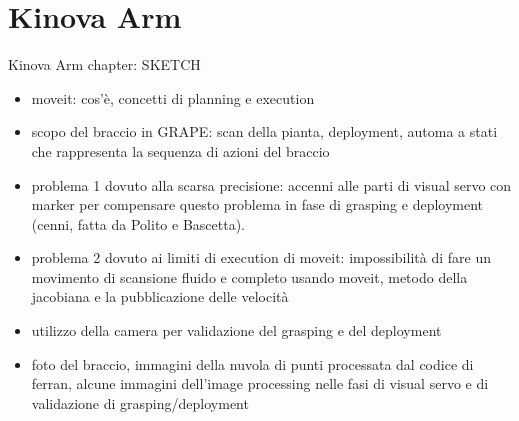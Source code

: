 
\chapter{Kinova Arm} \label{chap:kinovaArmChapter}

Kinova Arm chapter: SKETCH
\begin{itemize}
	\item moveit: cos'è, concetti di planning e execution
	\item scopo del braccio in GRAPE: scan della pianta, deployment, automa a stati che rappresenta la sequenza di azioni del braccio 
	\item problema 1 dovuto alla scarsa precisione: accenni alle parti di visual servo con marker per compensare questo problema in fase di grasping e deployment (cenni, fatta da Polito e Bascetta).
	\item problema 2 dovuto ai limiti di execution di moveit: impossibilità di fare un movimento di scansione fluido e completo usando moveit, metodo della jacobiana e la pubblicazione delle velocità
	\item utilizzo della camera per validazione del grasping e del deployment
	\item foto del braccio, immagini della nuvola di punti processata dal codice di ferran, alcune immagini dell'image processing nelle fasi di visual servo e di validazione di grasping/deployment
\end{itemize}